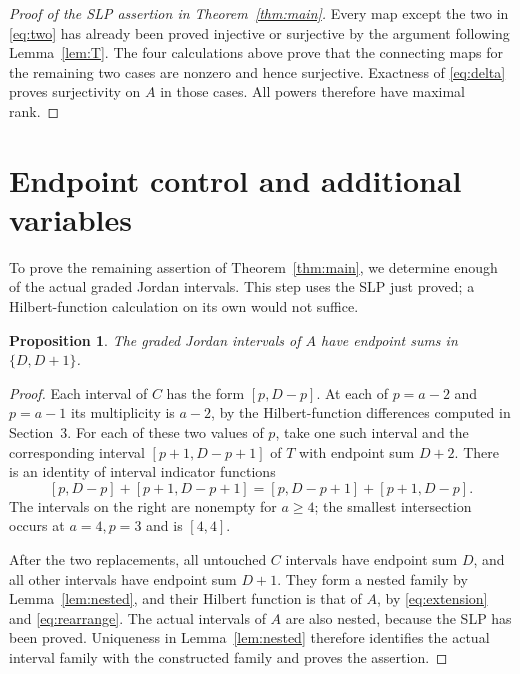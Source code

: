 \documentclass[11pt]{amsart}
\newtheorem{proposition}[theorem]{Proposition}
\theoremstyle{definition}
\begin{document}
\begin{proof}[Proof of the SLP assertion in Theorem~\ref{thm:main}]
Every map except the two in \eqref{eq:two} has already been proved
injective or surjective by the argument following Lemma~\ref{lem:T}.
The four calculations above prove that the connecting maps for the
remaining two cases are nonzero and hence surjective. Exactness of
\eqref{eq:delta} proves surjectivity on $A$ in those cases. All powers
therefore have maximal rank.
\end{proof}

\section{Endpoint control and additional variables}

To prove the remaining assertion of Theorem~\ref{thm:main}, we determine
enough of the actual graded Jordan intervals. This step uses the SLP
just proved; a Hilbert-function calculation on its own would not suffice.

\begin{proposition}\label{prop:endpoints}
The graded Jordan intervals of $A$ have endpoint sums in $\{D,D+1\}$.
\end{proposition}

\begin{proof}
Each interval of $C$ has the form $[p,D-p]$.
At each of $p=a-2$ and $p=a-1$ its multiplicity is $a-2$, by the
Hilbert-function differences computed in Section~3.
For each of these two values of $p$, take one such interval and the
corresponding interval $[p+1,D-p+1]$ of $T$ with endpoint sum $D+2$.
There is an identity of interval indicator functions
\begin{equation}\label{eq:rearrange}
 [p,D-p]+[p+1,D-p+1]
 =[p,D-p+1]+[p+1,D-p].
\end{equation}
The intervals on the right are nonempty for $a\ge4$; the smallest
intersection occurs at $a=4,p=3$ and is $[4,4]$.

After the two replacements, all untouched $C$ intervals have endpoint
sum $D$, and all other intervals have endpoint sum $D+1$.
They form a nested family by Lemma~\ref{lem:nested}, and their Hilbert
function is that of $A$, by \eqref{eq:extension} and
\eqref{eq:rearrange}. The actual intervals of $A$ are also nested,
because the SLP has been proved. Uniqueness in Lemma~\ref{lem:nested}
therefore identifies the actual interval family with the constructed
family and proves the assertion.
\end{proof}
\end{document}
